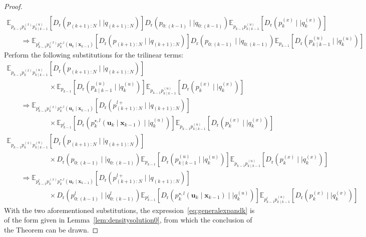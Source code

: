 \documentclass[a4paper,fleqn]{cas-sc}
\newcommand{\E}{\mathbb{E}}
\newcommand{\bv}[1]{\mathbf{#1}}
\newcommand{\Dr}[2]{{D}_{\text{r}}\left(#1\mid \mid #2 \right)}
\newcommand{\shortplant}[1]{p_{{#1}}^{(x)}}
\newcommand{\shortpolicy}[2]{p_{{#1}\mid{#2}}^{(u)}}
\newcommand{\optimalpolicygen}[3]{p^{\star,{#3}}_{{#1}} \left(\bv{u}_{{#1}}\mid \bv{x}_{{#2}} \right)}
\begin{document}
\begin{proof}
\[\begin{array}{l}
\\ \E_{p_{k-1}\shortplant{k}\shortpolicy{k}{k-1}}\left[\Dr{p_{(k+1):N}}{q_{(k+1):N}}\right] \Dr{p_{0:(k-1)}}{q_{0:(k-1)}}\E_{p_{k-1}\shortpolicy{k}{k-1}}\left[\Dr{\shortplant{k}}{q^{(x)}_k}\right] \\ \qquad \Rightarrow
  \E_{p^l_{k-1}\shortplant{k}\optimalpolicygen{k}{k-1}{l}}\left[\Dr{p_{(k+1):N}}{q_{(k+1):N}}\right] \Dr{p_{0:(k-1)}}{q_{0:(k-1)}}\E_{p_{k-1}}\left[\Dr{\shortpolicy{k}{k-1}}{q^{(u)}_k}\right] 
\end{array}
\]
Perform the following substitutions for the trilinear terms:
\[
\begin{array}{l}
\E_{p_{k-1}\shortplant{k}\shortpolicy{k}{k-1}}\left[\Dr{p_{(k+1):N}}{q_{(k+1):N}}\right] \\ 
\qquad\qquad\qquad \times
\E_{p_{k-1}}\left[\Dr{\shortpolicy{k}{k-1}}{q^{(u)}_k}\right]\E_{p_{k-1}\shortpolicy{k}{k-1}}\left[\Dr{\shortplant{k}}{q^{(x)}_k}\right]
\\
\qquad \Rightarrow 
\E_{p^l_{k-1}\shortplant{k}\optimalpolicygen{k}{k-1}{l}}\left[\Dr{p^{l+}_{(k+1):N}}{q_{(k+1):N}}\right] \\ 
\qquad\qquad\qquad \times
\E_{p^l_{k-1}}\left[\Dr{\optimalpolicygen{k}{k-1}{l}}{q^{(u)}_k}\right]\E_{p_{k-1}\shortpolicy{k}{k-1}}\left[\Dr{\shortplant{k}}{q^{(x)}_k}\right]
\\ 
 \E_{p_{k-1}\shortplant{k}\shortpolicy{k}{k-1}}\left[\Dr{p_{(k+1):N}}{q_{(k+1):N}}\right] \\ 
\qquad\qquad\qquad \times \Dr{p_{0:(k-1)}}{q_{0:(k-1)}}\E_{p_{k-1}}\left[\Dr{\shortpolicy{k}{k-1}}{q^{(u)}_k}\right]\E_{p_{k-1}\shortpolicy{k}{k-1}}\left[\Dr{\shortplant{k}}{q^{(x)}_k}\right] 
\\
\qquad \Rightarrow 
 \E_{p^l_{k-1}\shortplant{k}\optimalpolicygen{k}{k-1}{l}}\left[\Dr{p^{l+}_{(k+1):N}}{q_{(k+1):N}}\right] \\ 
\qquad\qquad\qquad \times \Dr{p^l_{0:(k-1)}}{q^l_{0:(k-1)}}\E_{p^l_{k-1}}\left[\Dr{\optimalpolicygen{k}{k-1}{l}}{q^{(u)}_k}\right]\E_{p^l_{k-1}\shortpolicy{k}{k-1}}\left[\Dr{\shortplant{k}}{q^{(x)}_k}\right] 
\end{array}
\]
With the two aforementioned substitutions, the expression~\eqref{eq:generalexpandk} is of the form given in Lemma~\ref{lem:densitysolution0}, from
which the conclusion of the Theorem can be drawn.

\end{proof}


\end{document}
